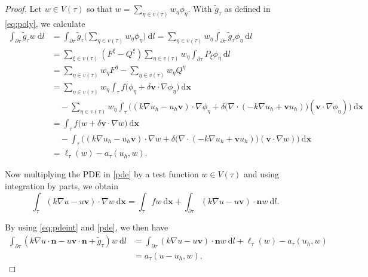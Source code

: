 \documentclass[times]{nlaauth}
\numberwithin{equation}{section}
\begin{document}
\begin{proof}
Let $w\in V(\tau)$ so that $w = \displaystyle \sum_{\eta \in v(\tau)} w_\eta \phi_\eta$.
With $\widetilde{g}_\tau$ as defined in \eqref{eq:poly}, we calculate
\begin{equation*}
\begin{aligned}
\int_{\partial \tau} \widetilde g_\tau w \ \text{d} l & = \int_{\partial \tau} \widetilde g_\tau \Big(\sum_{\eta \in v(\tau)} w_\eta \phi_\eta \Big) \ \text{d} l
= \sum_{\eta \in v(\tau)} w_\eta  \int_{\partial \tau} \widetilde g_\tau \phi_\eta \ \text{d} l  \\
& = \sum_{\xi \in v(\tau)} ( F^\xi - Q^\xi ) \sum_{\eta \in v(\tau)} w_\eta  \int_{\partial \tau} P_\xi  \phi_\eta \ \text{d} l  \\
& = \sum_{\eta \in v(\tau)} w_\eta F^\eta - \sum_{\eta \in v(\tau)} w_\eta Q^\eta \\
& = \sum_{\eta \in v(\tau)} w_\eta \int_\tau f \big(\phi_\eta + \delta \boldsymbol{v}  \cdot \nabla \phi_\eta \big) \ \text{d} \boldsymbol{x}  \\
& \quad - \sum_{\eta \in v(\tau)} w_\eta \int_\tau \Big( (k \nabla u_h - u_h \boldsymbol{v}) \cdot \nabla \phi_\eta + \delta  \big(  \nabla \cdot ( -k\nabla u_h + \boldsymbol{v} u_h ) \big)  ( \boldsymbol{v}  \cdot \nabla \phi_\eta)  \Big) \ \text{d} \boldsymbol{x}  \\
& = \int_\tau f \big(w + \delta \boldsymbol{v}  \cdot \nabla w \big) \ \text{d} \boldsymbol{x} \\
& \quad - \int_\tau \Big( ( k \nabla u_h - u_h \boldsymbol{v} ) \cdot \nabla w + \delta  \big(  \nabla \cdot ( -k\nabla u_h + \boldsymbol{v} u_h ) \big)  ( \boldsymbol{v}  \cdot \nabla w) \Big) \ \text{d} \boldsymbol{x} \\
& = \ell_\tau (w) - a_\tau(u_h, w).
\end{aligned}
\end{equation*}

\noindent
Now multiplying the PDE in \eqref{pde} by a test function $w\in V(\tau)$ and using integration by parts, we obtain
\begin{equation} \label{eq:pdeint}
\int_\tau (k \nabla u - u \boldsymbol{v} ) \cdot \nabla w \ \text{d} \boldsymbol{x} = \int_\tau f w \ \text{d} \boldsymbol{x} + \int_{\partial\tau} (k \nabla u - u \boldsymbol{v} ) \cdot \boldsymbol{n} w \ \text{d} l.
\end{equation}

\noindent
By using \eqref{eq:pdeint} and \eqref{pde}, we then have
\begin{equation*}
\begin{aligned}
\int_{\partial \tau} ( k \nabla u \cdot \boldsymbol{n} - u \boldsymbol{v} \cdot \boldsymbol{n} + \widetilde g_\tau) w \ \text{d} l  & = \int_{\partial \tau} (k \nabla u - u \boldsymbol{v} ) \cdot \boldsymbol{n} w \ \text{d} l  + \ell_\tau (w) - a_\tau(u_h, w) \\
& = a_\tau (u-u_h, w),
\end{aligned}
\end{equation*}


\end{proof}
\end{document}
